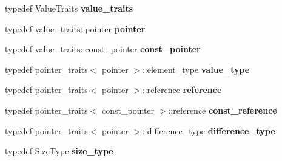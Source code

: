 \begin{DoxyCompactItemize}
\item 
\mbox{\label{classboost_1_1intrusive_1_1list__impl_a5cd55672f6df367749d91ef708834126}} 
typedef Value\+Traits {\bfseries value\+\_\+traits}
\item 
\mbox{\label{classboost_1_1intrusive_1_1list__impl_a671027d235426ed75ab9e4b2e090afe5}} 
typedef value\+\_\+traits\+::pointer {\bfseries pointer}
\item 
\mbox{\label{classboost_1_1intrusive_1_1list__impl_abc0f6e1c4c5f44b9edd5b96e798a618c}} 
typedef value\+\_\+traits\+::const\+\_\+pointer {\bfseries const\+\_\+pointer}
\item 
\mbox{\label{classboost_1_1intrusive_1_1list__impl_a011b08f2310cd73b4691870fc22e2cec}} 
typedef pointer\+\_\+traits$<$ pointer $>$\+::element\+\_\+type {\bfseries value\+\_\+type}
\item 
\mbox{\label{classboost_1_1intrusive_1_1list__impl_a881763b587dbe7c0237a552a9e89755a}} 
typedef pointer\+\_\+traits$<$ pointer $>$\+::reference {\bfseries reference}
\item 
\mbox{\label{classboost_1_1intrusive_1_1list__impl_a3d37629151c76fb8389ac3ba3b359201}} 
typedef pointer\+\_\+traits$<$ const\+\_\+pointer $>$\+::reference {\bfseries const\+\_\+reference}
\item 
\mbox{\label{classboost_1_1intrusive_1_1list__impl_a7053eac84f0c15a33c8192687d0840e3}} 
typedef pointer\+\_\+traits$<$ pointer $>$\+::difference\+\_\+type {\bfseries difference\+\_\+type}
\item 
\mbox{\label{classboost_1_1intrusive_1_1list__impl_a3e340b93081e392fba09de7145fb5733}} 
typedef Size\+Type {\bfseries size\+\_\+type}
\item 
\mbox{\label{classboost_1_1intrusive_1_1list__impl_a15c0189bf62eb9fb98bc07ef10b8cb23}} 

\end{DoxyCompactItemize}
